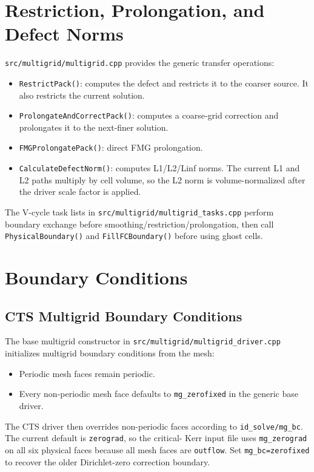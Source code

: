 \documentclass[11pt]{article}
\newcommand{\file}[1]{\nolinkurl{#1}}
\newcommand{\code}[1]{\texttt{#1}}
\begin{document}
\section{Restriction, Prolongation, and Defect Norms}

\file{src/multigrid/multigrid.cpp} provides the generic transfer operations:
\begin{itemize}
  \item \code{RestrictPack()}: computes the defect and restricts it to the
        coarser source.  It also restricts the current solution.
  \item \code{ProlongateAndCorrectPack()}: computes a coarse-grid correction and
        prolongates it to the next-finer solution.
  \item \code{FMGProlongatePack()}: direct FMG prolongation.
  \item \code{CalculateDefectNorm()}: computes L1/L2/Linf norms.  The current L1
        and L2 paths multiply by cell volume, so the L2 norm is volume-normalized
        after the driver scale factor is applied.
\end{itemize}

The V-cycle task lists in \file{src/multigrid/multigrid\_tasks.cpp} perform
boundary exchange before smoothing/restriction/prolongation, then call
\code{PhysicalBoundary()} and \code{FillFCBoundary()} before using ghost cells.

\section{Boundary Conditions}

\subsection{CTS Multigrid Boundary Conditions}

The base multigrid constructor in \file{src/multigrid/multigrid\_driver.cpp}
initializes multigrid boundary conditions from the mesh:
\begin{itemize}
  \item Periodic mesh faces remain periodic.
  \item Every non-periodic mesh face defaults to \code{mg\_zerofixed} in the
        generic base driver.
\end{itemize}

The CTS driver then overrides non-periodic faces according to
\code{id\_solve/mg\_bc}.  The current default is \code{zerograd}, so the critical-
Kerr input file uses \code{mg\_zerograd} on all six physical faces because all
mesh faces are \code{outflow}.  Set \code{mg\_bc=zerofixed} to recover the older
Dirichlet-zero correction boundary.
\end{document}
